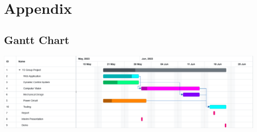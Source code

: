 \section{Appendix}
\appendix

\renewcommand{\thesubsection}{\Alph{subsection}}

\subsection{Gantt Chart}
\label{app:gantt}
\begin{center}
    \includegraphics[width=\textwidth]{includes/Y2GanttChartt.pdf}
\end{center}